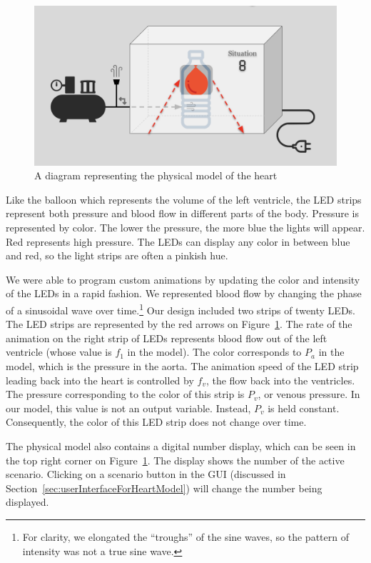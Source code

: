 \documentclass[a4paper, 10pt, american, titlepage]{article}
\begin{document}
\begin{figure}[h] \centering
    \includegraphics[width=\textwidth]{interactive-model.png}
    \caption{A diagram representing the physical model of the heart}
    \label{fig:interactiveModel}
\end{figure}

Like the balloon which represents the volume of the left ventricle, the LED
strips represent both pressure and blood flow in different parts of the body.
Pressure is represented by color. The lower the pressure, the more blue the
lights will appear. Red represents high pressure. The LEDs can display any color
in between blue and red, so the light strips are often a pinkish hue.

We were able to program custom animations by updating the color and intensity of
the LEDs in a rapid fashion. We represented blood flow by changing the phase of
a sinusoidal wave over time.\footnote{For clarity, we elongated the ``troughs''
of the sine waves, so the pattern of intensity was not a true sine wave.} Our
design included two strips of twenty LEDs. The LED strips are represented by the
red arrows on Figure~\ref{fig:interactiveModel}. The rate of the animation on
the right strip of LEDs represents blood flow out of the left ventricle (whose
value is $f_{1}$ in the model). The color corresponds to $P_{a}$ in the model,
which is the pressure in the aorta. The animation speed of the LED strip leading
back into the heart is controlled by $f_{v}$, the flow back into the ventricles.
The pressure corresponding to the color of this strip is $P_{v}$, or venous
pressure. In our model, this value is not an output variable. Instead, $P_{v}$
is held constant. Consequently, the color of this LED strip does not change over
time.

The physical model also contains a digital number display, which can be seen in
the top right corner on Figure~\ref{fig:interactiveModel}. The display shows the
number of the active scenario. Clicking on a scenario button in the GUI
(discussed in Section~\ref{sec:userInterfaceForHeartModel}) will change the
number being displayed.
\end{document}
